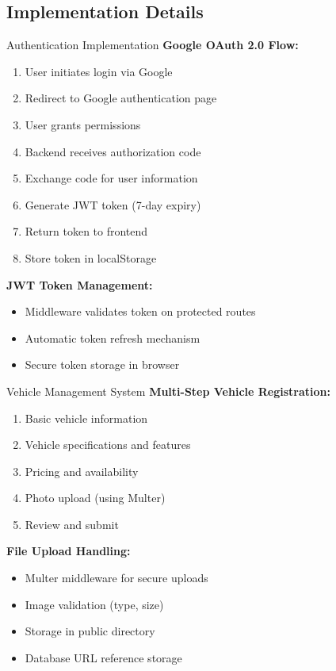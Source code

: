 \subsection{Implementation Details}

\begin{frame}{Authentication Implementation}
\textbf{Google OAuth 2.0 Flow:}
\begin{enumerate}
    \item User initiates login via Google
    \item Redirect to Google authentication page
    \item User grants permissions
    \item Backend receives authorization code
    \item Exchange code for user information
    \item Generate JWT token (7-day expiry)
    \item Return token to frontend
    \item Store token in localStorage
\end{enumerate}

\vspace{0.3cm}
\textbf{JWT Token Management:}
\begin{itemize}
    \item Middleware validates token on protected routes
    \item Automatic token refresh mechanism
    \item Secure token storage in browser
\end{itemize}
\end{frame}

\begin{frame}{Vehicle Management System}
\textbf{Multi-Step Vehicle Registration:}
\begin{enumerate}
    \item Basic vehicle information
    \item Vehicle specifications and features
    \item Pricing and availability
    \item Photo upload (using Multer)
    \item Review and submit
\end{enumerate}

\vspace{0.3cm}
\textbf{File Upload Handling:}
\begin{itemize}
    \item Multer middleware for secure uploads
    \item Image validation (type, size)
    \item Storage in public directory
    \item Database URL reference storage
\end{itemize}
\end{frame}

